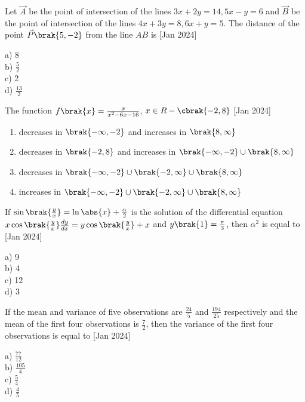 \iffalse
\title{January 2024, shift 2}
\author{EE24BTECH11062}	
\section{mcq-single}
\fi
   
\item Let $\vec{A}$ be the point of intersection of the lines $3x+2y=14, 5x-y=6$ and $\vec{B}$ be the point of intersection of the lines $4x+3y=8, 6x+y=5.$ The distance of the point $\vec{P}\brak{5,-2}$ from the line $AB$ is \hfill{[Jan 2024]}
\begin{multicols}{4}
    a) 8\\
    b) $\frac{5}{2}$\\
    c) 2\\
    d) $\frac{13}{2}$
\end{multicols}
 \item The function $f\brak{x}=\frac{x}{x^2-6x-16}$, $x\in R-\cbrak{-2,8}$ \hfill{[Jan 2024]}
 \begin{enumerate}
     \item  decreases in $\brak{-\infty,-2}$ and increases in $\brak{8,\infty}$\\
     \item decreases in $\brak{-2,8}$ and increases in $\brak{-\infty,-2}\cup \brak{8,\infty}$\\
     \item decreases in $\brak{-\infty,-2}\cup\brak{-2,\infty}\cup\brak{8,\infty}$\\
     \item  increases in $\brak{-\infty,-2}\cup\brak{-2,\infty}\cup\brak{8,\infty}$
 \end{enumerate}
 
 \item If $\sin\brak{\frac{y}{x}}=\ln\abs{x}+\frac{\alpha}{2}$ is the solution of the differential equation $x\cos\brak{\frac{y}{x}}\frac{dy}{dx}=y\cos\brak{\frac{y}{x}}+x$ and $y\brak{1}=\frac{\pi}{3}$, then $\alpha^2$ is equal to \hfill{[Jan 2024]}
 \begin{multicols}{4}
    a) 9\\
    b) 4\\
    c) 12\\
    d) 3
 \end{multicols}
 
\item   If the mean and variance of five observations are $\frac{24}{5}$ and $\frac{194}{25}$ respectively and the mean of the first four observations is $\frac{7}{2}$, then the variance of the first four observations is equal to \hfill{[Jan 2024]}
\begin{multicols}{4}
    a) $\frac{77}{12}$\\
    b) $\frac{105}{4}$\\
    c) $\frac{5}{4}$\\
    d) $\frac{4}{5}$
\end{multicols}

